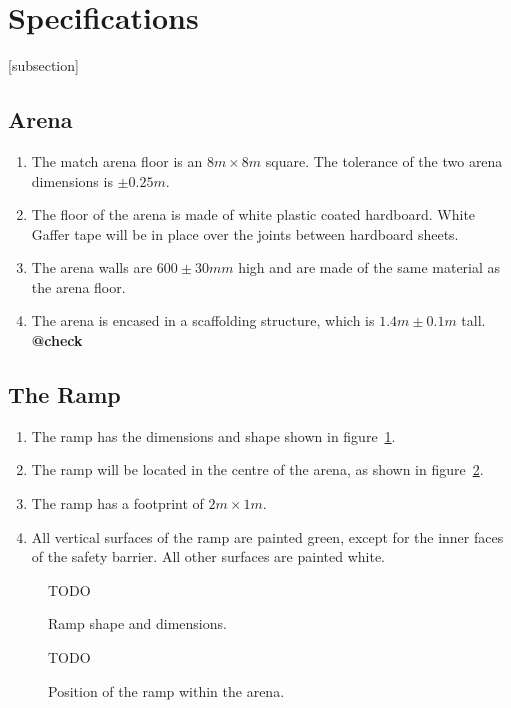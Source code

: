 \section{Specifications}
[subsection]
\newcommand{\rcnii}{\stepcounter{rulei}\arabic{section}.\arabic{subsection}.\arabic{rulei}}
\renewcommand{\labelenumi}{\rcnii}

\subsection{Arena}
\begin{enumerate}
\item The match arena floor is an $8m \times 8m$ square.
 The tolerance of the two arena dimensions is $\pm0.25m$.
\item The floor of the arena is made of white plastic coated hardboard.
 White Gaffer tape will be in place over the joints between hardboard sheets.
\item The arena walls are $600\pm30mm$ high and are made of the same material as the arena floor.
\item The arena is encased in a scaffolding structure, which is $1.4m \pm0.1m$ tall.	\textbf{@check}
\end{enumerate}

\subsection{The Ramp}
\label{ramp}
\begin {enumerate} 
\item The ramp has the dimensions and shape shown in figure~\ref{fig:ramp-dim}.
\item The ramp will be located in the centre of the arena, as shown in figure~\ref{fig:ramp-pos}.
\item The ramp has a footprint of $2m \times 1m$.
\item All vertical surfaces of the ramp are painted green, except for the inner faces of the safety barrier.  All other surfaces are painted white.
\end {enumerate}

\begin{figure}
  TODO
  \caption{\label{fig:ramp-dim}Ramp shape and dimensions.}
\end{figure}

\begin{figure}
  TODO
  \caption{\label{fig:ramp-pos}Position of the ramp within the arena.}
\end{figure}

